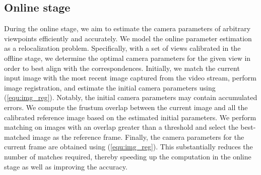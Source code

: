 \subsection{Online stage}

During the online stage, we aim to estimate the camera parameters of arbitrary viewpoints efficiently and accurately. We model the online parameter estimation as a relocalization problem. Specifically, with a set of views calibrated in the offline stage, we determine the optimal camera parameters for the given view in order to best align with the correspondences. Initially, we match the current input image with the most recent image captured from the video stream, perform image registration, and estimate the initial camera parameters using (\ref{equ:img_reg}). Notably, the initial camera parameters may contain accumulated errors. We compute the frustum overlap between the current image and all the calibrated reference image based on the estimated initial parameters. 
We perform matching on images with an overlap greater than a threshold and select the best-matched image as the reference frame. Finally, the camera parameters for the current frame are obtained using (\ref{equ:img_reg}).
This substantially reduces the number of matches required, thereby speeding up the computation in the online stage as well as improving the accuracy.